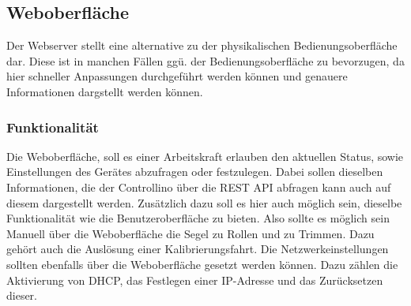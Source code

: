 \subsection{Weboberfläche}
Der Webserver stellt eine alternative zu der physikalischen Bedienungsoberfläche dar. Diese ist in manchen Fällen ggü. der Bedienungsoberfläche zu bevorzugen, da hier schneller Anpassungen durchgeführt werden können und genauere Informationen dargstellt werden können.
\subsubsection{Funktionalität}
Die Weboberfläche, soll es einer Arbeitskraft erlauben den aktuellen Status, sowie Einstellungen des Gerätes abzufragen oder festzulegen. Dabei sollen dieselben Informationen, die der Controllino über die \ac{REST} \ac{API} abfragen kann auch auf diesem dargestellt werden. Zusätzlich dazu soll es hier auch möglich sein, dieselbe Funktionalität wie die Benutzeroberfläche zu bieten. Also sollte es möglich sein Manuell über die Weboberfläche die Segel zu Rollen und zu Trimmen. Dazu gehört auch die Auslösung einer Kalibrierungsfahrt.
Die Netzwerkeinstellungen sollten ebenfalls über die Weboberfläche gesetzt werden können. Dazu zählen die Aktivierung von DHCP, das Festlegen einer IP-Adresse und das Zurücksetzen dieser.
